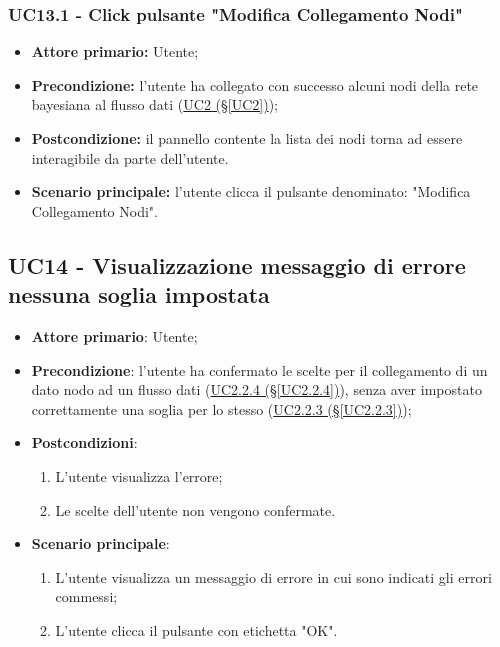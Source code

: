 \subsubsection{UC13.1 - Click pulsante "Modifica Collegamento Nodi"}\label{UC13.1}
\begin{itemize}
\item \textbf{Attore primario:} Utente;
\item \textbf{Precondizione:} l'utente ha collegato con successo alcuni nodi della rete bayesiana al flusso dati 			(\hyperref[UC2]{UC2 (§\ref*{UC2})});
\item \textbf{Postcondizione:} il pannello contente la lista dei nodi torna ad essere interagibile da parte dell'utente.
\item \textbf{Scenario principale:} l'utente clicca il pulsante denominato: "Modifica Collegamento Nodi".
\end{itemize}
\newpage

\subsection{UC14 - Visualizzazione messaggio di errore nessuna soglia impostata}\label{UC14}
\begin{itemize}
\item \textbf{Attore primario}: Utente;
\item \textbf{Precondizione}: l'utente ha confermato le scelte per il collegamento di un dato nodo ad un flusso 				dati (\hyperref[UC2.2.4]{UC2.2.4 (§\ref*{UC2.2.4})}), senza aver impostato correttamente una soglia per lo stesso 	(\hyperref[UC2.2.3]{UC2.2.3 (§\ref*{UC2.2.3})});
\item \textbf{Postcondizioni}: 
	\begin{enumerate}
	\item L'utente visualizza l'errore;
	\item Le scelte dell'utente non vengono confermate.
	\end{enumerate}
\item \textbf{Scenario principale}: 
	\begin{enumerate}
	\item L'utente visualizza un messaggio di errore in cui sono indicati gli errori commessi;
	\item L'utente clicca il pulsante con etichetta "OK".
	\end{enumerate}
\end{itemize}

\pagebreak

